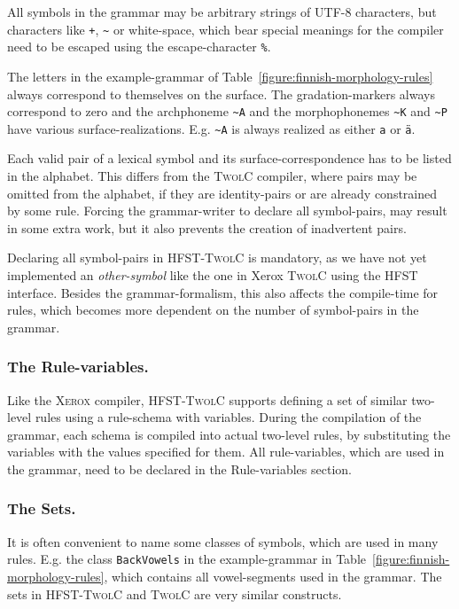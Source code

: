 \documentclass[postprint]{flammie}
\begin{document}
All symbols in the grammar may be arbitrary strings of UTF-8
characters, but characters like \verb|+|, \verb|~| or white-space,
which bear special meanings for the compiler need to be escaped using
the escape-character \verb|%|.
 
The letters in the example-grammar of
Table~\ref{figure:finnish-morphology-rules} always correspond to
themselves on the surface. The gradation-markers always correspond to
zero and the archphoneme \verb|~A| and the morphophonemes \verb|~K|
and \verb|~P| have various surface-realizations. E.g. \verb|~A| is
always realized as either \verb|a| or \texttt{\"a}.

Each valid pair of a lexical symbol and its surface-correspondence has
to be listed in the alphabet. This differs from the \textsc{TwolC}
compiler, where pairs may be omitted from the alphabet, if they are
identity-pairs or are already constrained by some rule. Forcing the
grammar-writer to declare all symbol-pairs, may result in some extra
work, but it also prevents the creation of inadvertent pairs.

Declaring all symbol-pairs in \textsc{HFST-TwolC} is mandatory, as we
have not yet implemented an \textit{other-symbol} like the one in
Xerox \textsc{TwolC} \cite{Karttunen92} using the \textsc{HFST}
interface. Besides the grammar-formalism, this also affects the
compile-time for rules, which becomes more dependent on the number of
symbol-pairs in the grammar.
 
\subsubsection{The Rule-variables.}

Like the \textsc{Xerox} compiler, \textsc{HFST-TwolC} supports
defining a set of similar two-level rules using a rule-schema with
variables. During the compilation of the grammar, each schema is
compiled into actual two-level rules, by substituting the variables
with the values specified for them. All rule-variables, which are used
in the grammar, need to be declared in the Rule-variables section.

\subsubsection{The Sets.}

It is often convenient to name some classes of symbols, which are used
in many rules. E.g. the class \verb|BackVowels| in the example-grammar
in Table~\ref{figure:finnish-morphology-rules}, which contains all
vowel-segments used in the grammar. The sets in \textsc{HFST-TwolC}
and \textsc{TwolC} are very similar constructs.
\end{document}
